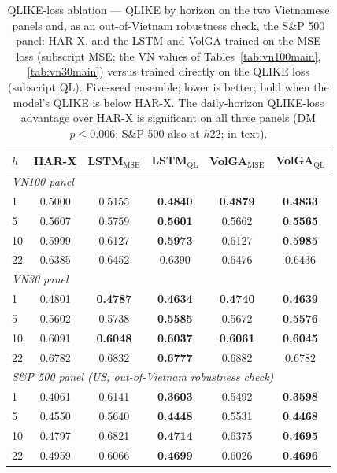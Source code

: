 \documentclass{llncs}
\begin{document}
\begin{table}[t]
\centering
\caption{QLIKE-loss ablation --- QLIKE by horizon on the two Vietnamese panels and, as an
out-of-Vietnam robustness check, the S\&P 500 panel: HAR-X, and the LSTM and VolGA trained on the MSE
loss (subscript MSE; the VN values of Tables~\ref{tab:vn100main}, \ref{tab:vn30main}) versus trained
directly on the QLIKE loss (subscript QL). Five-seed ensemble; lower is better; bold when the model's
QLIKE is below HAR-X. The daily-horizon QLIKE-loss advantage over HAR-X is significant on all three
panels (DM $p\le0.006$; S\&P 500 also at $h22$; in text).}
\label{tab:qlikeloss}
\footnotesize
\setlength{\tabcolsep}{5pt}
\begin{tabular}{lccccc}
\toprule
$h$ & HAR-X & LSTM$_{\mathrm{MSE}}$ & LSTM$_{\mathrm{QL}}$ & VolGA$_{\mathrm{MSE}}$ & VolGA$_{\mathrm{QL}}$ \\
\midrule
\multicolumn{6}{l}{\emph{VN100 panel}} \\
1 & 0.5000 & 0.5155 & \textbf{0.4840} & \textbf{0.4879} & \textbf{0.4833} \\
5 & 0.5607 & 0.5759 & \textbf{0.5601} & 0.5662 & \textbf{0.5565} \\
10 & 0.5999 & 0.6127 & \textbf{0.5973} & 0.6127 & \textbf{0.5985} \\
22 & 0.6385 & 0.6452 & 0.6390 & 0.6476 & 0.6436 \\
\midrule
\multicolumn{6}{l}{\emph{VN30 panel}} \\
1 & 0.4801 & \textbf{0.4787} & \textbf{0.4634} & \textbf{0.4740} & \textbf{0.4639} \\
5 & 0.5602 & 0.5738 & \textbf{0.5585} & 0.5672 & \textbf{0.5576} \\
10 & 0.6091 & \textbf{0.6048} & \textbf{0.6037} & \textbf{0.6061} & \textbf{0.6045} \\
22 & 0.6782 & 0.6832 & \textbf{0.6777} & 0.6882 & 0.6782 \\
\midrule
\multicolumn{6}{l}{\emph{S\&P 500 panel (US; out-of-Vietnam robustness check)}} \\
1 & 0.4061 & 0.6141 & \textbf{0.3603} & 0.5492 & \textbf{0.3598} \\
5 & 0.4550 & 0.5640 & \textbf{0.4448} & 0.5531 & \textbf{0.4468} \\
10 & 0.4797 & 0.6821 & \textbf{0.4714} & 0.6375 & \textbf{0.4695} \\
22 & 0.4959 & 0.6066 & \textbf{0.4699} & 0.6026 & \textbf{0.4696} \\
\bottomrule
\end{tabular}
\end{table}
\end{document}
